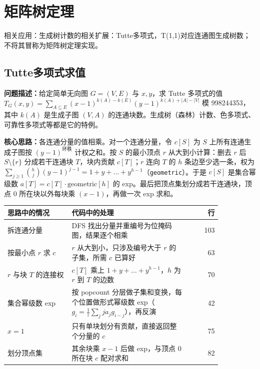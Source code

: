 \Needspace{180pt}

\chapter{矩阵树定理}

\noindent 相关应用：生成树计数的相关扩展：Tutte多项式，T(1,1)对应连通图生成树数；不将其冒称为矩阵树定理实现。

\section{Tutte多项式求值}\label{compact-tutte}

\noindent\textbf{问题描述：}\allowbreak 给定简单无向图 $G=(V,E)$ 与 $x,y$，求 Tutte 多项式的值 $T_G(x,y)=\sum_{A\subseteq E}(x-1)^{k(A)-k(E)}(y-1)^{k(A)+|A|-|V|}$ 模 998244353，其中 $k(A)$ 是生成子图 $(V,A)$ 的连通块数。生成树（森林）计数、色多项式、可靠性多项式等都是它的特例。

\textbf{核心思路：}\allowbreak 各连通分量的值相乘。对一个连通分量，令 $c[S]$ 为 $S$ 上所有连通生成子图按 $(y-1)^{\text{环秩}}$ 计权之和。按 $S$ 的最小顶点 $r$ 从大到小计算：删去 $r$ 后 $S\setminus\{r\}$ 分成若干连通块 $T$，块内贡献 $c[T]$；$r$ 连向 $T$ 的 $h$ 条边至少选一条，权为 $\sum_{j\ge1}\binom{h}{j}(y-1)^{j-1}=1+y+\dots+y^{h-1}$（\texttt{geometric}）。于是 $c[S]$ 是集合幂级数 $a[T]=c[T]\cdot\mathrm{geometric}[h]$ 的 exp。最后把顶点集划分成若干连通块，顶点 0 所在块以外每块乘 $(x-1)$，再做一次 exp 求和。

\begin{center}\small
\begin{tabular}{@{}p{0.30\linewidth}p{0.55\linewidth}r@{}}
\toprule
思路中的情况 & 代码中的处理 & 行\\
\midrule
拆连通分量 & DFS 找出分量并重编号为位掩码图，结果逐个相乘 & 103\\
按最小点 $r$ 求 $c$ & $r$ 从大到小，只涉及编号大于 $r$ 的子集，所需 $c$ 已算好 & 63\\
$r$ 与块 $T$ 的连接权 & $c[T]$ 乘上 $1+y+\dots+y^{h-1}$，$h$ 为 $r$ 到 $T$ 的边数 & 70\\
集合幂级数 exp & 按 popcount 分层做子集和变换，每个位置做形式幂级数 exp（$g_i=\frac1i\sum_j j a_j g_{i-j}$），再反演 & 42\\
$x=1$ & 只有单块划分有贡献，直接返回整个分量的 $c$ & 75\\
划分顶点集 & 其余块乘 $x-1$ 后做 exp，与顶点 0 所在块 $c$ 配对求和 & 82\\
\bottomrule
\end{tabular}
\end{center}




